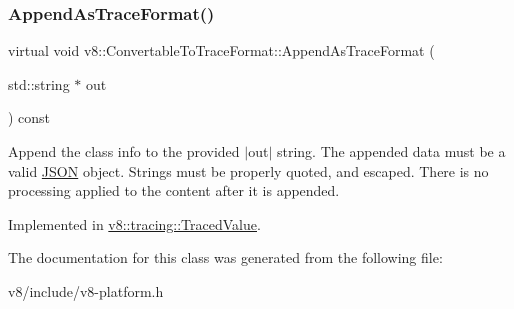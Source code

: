 \subsubsection{\texorpdfstring{Append\+As\+Trace\+Format()}{AppendAsTraceFormat()}}
{\footnotesize\ttfamily virtual void v8\+::\+Convertable\+To\+Trace\+Format\+::\+Append\+As\+Trace\+Format (\begin{DoxyParamCaption}\item[{std\+::string $\ast$}]{out }\end{DoxyParamCaption}) const\hspace{0.3cm}{\ttfamily [pure virtual]}}

Append the class info to the provided $\vert$out$\vert$ string. The appended data must be a valid \mbox{\hyperlink{classv8_1_1JSON}{J\+S\+ON}} object. Strings must be properly quoted, and escaped. There is no processing applied to the content after it is appended. 

Implemented in \mbox{\hyperlink{classv8_1_1tracing_1_1TracedValue_a87e2daa913cf7f97deaeca85dcbbfa3a}{v8\+::tracing\+::\+Traced\+Value}}.



The documentation for this class was generated from the following file\+:\begin{DoxyCompactItemize}
\item 
v8/include/v8-\/platform.\+h\end{DoxyCompactItemize}
